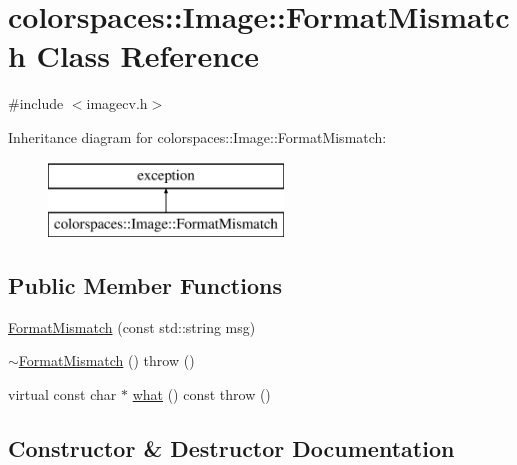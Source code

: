 \hypertarget{classcolorspaces_1_1_image_1_1_format_mismatch}{}\section{colorspaces\+:\+:Image\+:\+:Format\+Mismatch Class Reference}
\label{classcolorspaces_1_1_image_1_1_format_mismatch}


{\ttfamily \#include $<$imagecv.\+h$>$}

Inheritance diagram for colorspaces\+:\+:Image\+:\+:Format\+Mismatch\+:\begin{figure}[H]
\begin{center}
\leavevmode
\includegraphics[height=2.000000cm]{classcolorspaces_1_1_image_1_1_format_mismatch}
\end{center}
\end{figure}
\subsection*{Public Member Functions}
\begin{DoxyCompactItemize}
\item 
\hyperlink{classcolorspaces_1_1_image_1_1_format_mismatch_a75b74eb84462dba829465eebadbfa531}{Format\+Mismatch} (const std\+::string msg)
\item 
\hyperlink{classcolorspaces_1_1_image_1_1_format_mismatch_aaf8f52b425f244849b8b84d384eef961}{$\sim$\+Format\+Mismatch} ()  throw ()
\item 
virtual const char $\ast$ \hyperlink{classcolorspaces_1_1_image_1_1_format_mismatch_ab8255b66f6ed6b5034155e0132654f01}{what} () const  throw ()
\end{DoxyCompactItemize}


\subsection{Constructor \& Destructor Documentation}
\mbox{\label{classcolorspaces_1_1_image_1_1_format_mismatch_a75b74eb84462dba829465eebadbfa531}} 
